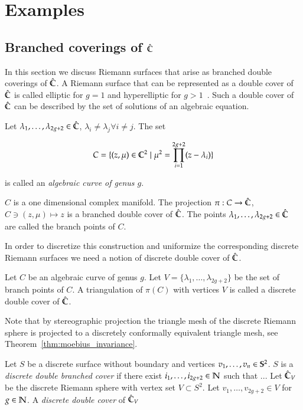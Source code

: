 \documentclass[Thesis.tex]{subfiles}
\begin{document}
\chapter{Examples}

\section{Branched coverings of $\Chat$}
In this section we discuss Riemann surfaces that arise as branched double coverings of $\hat{\C}$. A Riemann surface that can be represented as a double cover of $\Chat$ is called elliptic for $g=1$ and hyperelliptic for $g>1$~\cite[p.~235]{Jost2007}. Such a double cover of $\Chat$ can be described by the
set of solutions of an algebraic equation.

\begin{definition}
Let $\lambda_1,\ldots,\lambda_{2g+2}\in \hat{\C}$, $\lambda_i\neq \lambda_j \forall i\neq j$. The
set

\begin{equation}
\label{eq:branched_cover}
C=\{(z, \mu)\in\C^2 \mid \mu^2 = \prod_{i=1}^{2g+2}(z-\lambda_i)\}
\end{equation}

is called an \emph{algebraic curve of genus $g$}.
\end{definition}

$C$ is a one dimensional complex manifold. The projection $\pi:C\to\Chat$, $C\ni(z,\mu)\mapsto z$ is a branched double cover of $\Chat$. The points $\lambda_1,\ldots,\lambda_{2g+2}\in \hat{\C}$ are called
the branch points of $C$.

In order to discretize this construction and uniformize the corresponding discrete Riemann surfaces
we need a notion of discrete double cover of $\Chat$.

\begin{definition}
Let $C$ be an algebraic curve of genus $g$. Let $V = \{\lambda_1,\ldots,\lambda_{2g+2}\}$ be the set of
branch points of $C$. A triangulation of $\pi(C)$ with vertices $V$ is called a discrete double cover of 
$\Chat$.
\end{definition}

Note that by stereographic projection the triangle mesh of the discrete Riemann sphere is projected to a
discretely conformally equivalent triangle mesh, see Theorem~\ref{thm:moebius_invariance}.

\begin{definition}
Let $S$ be a discrete surface without boundary and vertices $v_1,\ldots,v_n\in\S^2$. $S$ is a \emph{discrete double branched cover} if there exist $i_1,\ldots, i_{2g+2}\in \N$ such that ... 
Let $\Chat_V$ be the discrete Riemann sphere with vertex set $V\subset S^2$. Let $v_1,
\ldots,v_{2g+2} \in V$ for $g\in \N$. A \emph{discrete double cover} of $\Chat_V$ 
\end{definition}
\end{document}

